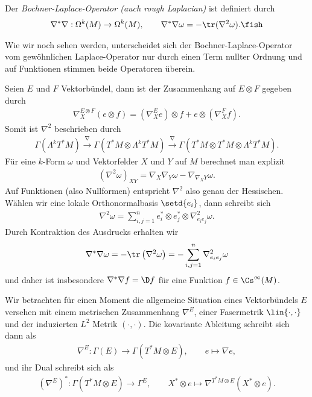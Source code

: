 \documentclass[%
	paper=a5,%
	fleqn,%
	DIV=18,%
	BCOR=0mm,
	fontsize=11pt,
	titlepage=false,%
	bibliography=totoc,
	DIV=18,%
	twoside=true,
	pdftitle=Riemannsche Geometrie,
	pdfauthor=Uwe Semmelmann,
	numbers=noendperiod]%
	{scrbook}
\begin{document}
\begin{defn}
Der \emph{Bochner-Laplace-Operator (auch rough Laplacian)} ist definiert durch
\begin{align*}
\nabla^*\nabla : \Omega^k(M)\to \Omega^k(M),\qquad \nabla^*\nabla\omega = - \tr(\nabla^2\omega).\fish
\end{align*}
\end{defn}

Wie wir noch sehen werden, unterscheidet sich der Bochner-Laplace-Operator vom gewöhnlichen Laplace-Operator nur durch einen Term nullter Ordnung und auf Funktionen stimmen beide Operatoren überein.

\begin{rem}
Seien $E$ und $F$ Vektorbündel, dann ist der Zusammenhang auf $E\otimes F$ gegeben durch
\begin{align*}
\nabla_{X}^{E\otimes F} (e\otimes f) = (\nabla_{X}^E e)\otimes f + e\otimes (\nabla_{X}^F f).
\end{align*}
Somit ist $\nabla^2$ beschrieben durch
\begin{align*}
\Gamma(\Lambda^k T^*M) \overset{\nabla}{\longrightarrow}
\Gamma(T^*M\otimes\Lambda^k T^*M) \overset{\nabla}{\longrightarrow}
\Gamma(T^*M\otimes T^*M\otimes\Lambda^k T^*M).
\end{align*}
Für eine $k$-Form $\omega$ und Vektorfelder $X$ und $Y$ auf $M$ berechnet man explizit
\begin{align*}
(\nabla^2\omega)_{XY} = \nabla_{X}\nabla_{Y}\omega - \nabla_{\nabla_{X}Y}\omega.
\end{align*}
Auf Funktionen (also Nullformen) entspricht $\nabla^2$ also genau der Hessischen. Wählen wir eine lokale Orthonormalbasis $\setd{e_{i}}$, dann schreibt sich
\begin{align*}
\nabla^2 \omega = \sum_{i,j=1}^n e_{i}^* \otimes e_{j}^*\otimes \nabla_{e_{i}e_{j}}^2 \omega.
\end{align*}
Durch Kontraktion des Ausdrucks erhalten wir
\begin{align*}
\nabla^*\nabla \omega = - \tr\left(\nabla^2\omega\right) =  -\sum_{i,j=1}^n \nabla_{e_{i}e_{j}}^2\omega
\end{align*}
und daher ist insbesondere $\nabla^*\nabla f = \D f$ für eine Funktion $f\in\Cs^\infty(M)$.\map
\end{rem}

Wir betrachten für einen Moment die allgemeine Situation eines Vektorbündels $E$ versehen mit einem metrischen Zusammenhang $\nabla^E$, einer Fasermetrik $\lin{\cdot,\cdot}$ und der induzierten $L^2$ Metrik $(\cdot,\cdot)$. Die kovariante Ableitung schreibt sich dann als
\begin{align*}
\nabla^E : \Gamma(E)\to \Gamma(T^*M\otimes E),\qquad e\mapsto \nabla e,
\end{align*}
und ihr Dual schreibt sich als
\begin{align*}
(\nabla^E)^* : \Gamma(T^*M\otimes E)\to \Gamma^E,\qquad X^*\otimes e\mapsto \nabla^{T^*M\otimes E} (X^*\otimes e).
\end{align*}
\end{document}

